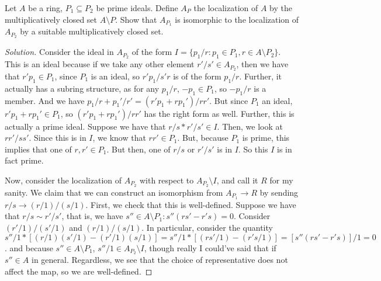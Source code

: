 \documentclass[10pt]{article}
\newenvironment{problem}[2][Problem]{\begin{trivlist}
\item[\hskip \labelsep {\bfseries #1}\hskip \labelsep {\bfseries #2.}]}{\end{trivlist}}
\begin{document}
\begin{problem}{4.4}

Let $A$ be a ring, $P_1 \subseteq P_2$ be prime ideals. Define $A_P$ the localization of $A$ by the multiplicatively closed set $A \setminus P$. Show that $A_{P_1}$ is isomorphic to the localization of $A_{P_2}$ by a suitable multiplicatively closed set.

\end{problem}

\begin{proof}[Solution]
 


Consider the ideal in $A_{P_2}$ of the form $I = \{ p_1/r : p_1 \in P_1, r \in A \setminus P_2 \}$. This is an ideal because if we take any other element $r'/s' \in A_{P_2}$, then we have that $r'p_1 \in P_1$, since $P_1$ is an ideal, so $r'p_1/s'r$ is of the form $p_1/r$. Further, it actually has a subring structure, as for any $p_1/r$, $-p_1 \in P_1$, so $-p_1/r$ is a member. And we have $p_1/r + p_1'/r' = (r'p_1 + rp_1')/rr'$. But since $P_1$ an ideal, $r'p_1 + rp_1' \in P_1$, so $ (r'p_1 + rp_1')/rr'$ has the right form as well. Further, this is actually a prime ideal. Suppose we have that $r/s * r'/s' \in I$. Then, we look at $rr'/ss'$. Since this is in $I$, we know that $rr' \in P_1$. But, because $P_1$ is prime, this implies that one of $r,r' \in P_1$. But then, one of $r/s$ or $r'/s'$ is in $I$. So this $I$ is in fact prime.

Now, consider the localization of $A_{P_2}$ with respect to $A_{P_2} \setminus I$, and call it $R$ for my sanity. We claim that we can construct an isomorphism from $A_{P_1} \to R$ by sending $r/s \to (r/1)/(s/1)$. First, we check that this is well-defined. Suppose we have that $r/s \sim r'/s'$, that is, we have $s'' \in A \setminus P_1 : s''(rs' - r's) = 0$. Consider $(r'/1)/(s'/1)$ and $(r/1)/(s/1)$. In particular, consider the quantity $s''/1 * [(r/1)(s'/1) - (r'/1)(s/1)] = s''/1 * [(rs'/1) - (r's/1)] = [s''(rs' - r's)]/1 = 0$. and because $s'' \in A \setminus P_1$, $s''/1 \in A_{P_2} \setminus I$, though really I could've said that if $s'' \in A$ in general. Regardless, we see that the choice of representative does not affect the map, so we are well-defined.


\end{proof}
\end{document}
